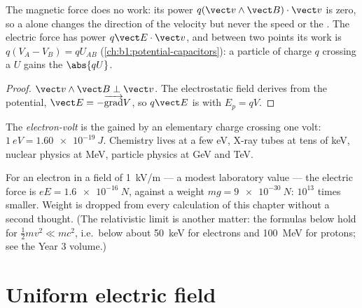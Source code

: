 \begin{proposition}\label{prop:b1:charged-particles:work}
The magnetic force does no work: its power $q(\vect v\wedge\vect B)\cdot\vect v$
is zero, so a  alone changes the direction of the velocity
but never the speed or the . The electric force has power
$q\vect E\cdot\vect v$, and between two points its work is $q(V_A - V_B) =
qU_{AB}$ (\cref{ch:b1:potential-capacitors}): a particle of charge $q$
crossing a  $U$ gains the  $\abs{qU}$.
\end{proposition}

\begin{proof}
$\vect v\wedge\vect B \perp \vect v$. The electrostatic field derives from
the potential, $\vect E = -\overrightarrow{\operatorname{grad}}V$, so $q\vect E$
is  with $E_p = qV$.
\end{proof}

\begin{definition}\label{def:b1:charged-particles:eV}
The \emph{electron-volt} is the  gained by an elementary
charge crossing one volt: $\qty{1}{eV} = \qty{1.60e-19}{J}$. Chemistry
lives at a few eV, X-ray tubes at tens of keV, nuclear physics at MeV,
particle physics at GeV and TeV.
\end{definition}

\begin{remark}\label{rem:b1:charged-particles:gravity}
For an electron in a field of \qty{1}{kV/m} --- a modest laboratory
value --- the electric force is $eE = \qty{1.6e-16}{N}$, against a weight
$mg = \qty{9e-30}{N}$: $10^{13}$ times smaller. Weight is dropped from
every calculation of this chapter without a second thought. (The
relativistic limit is another matter: the formulas below hold for
$\tfrac12 mv^2 \ll mc^2$, i.e.\ below about \qty{50}{keV} for electrons
and \qty{100}{MeV} for protons; see the Year 3 volume.)
\end{remark}

\section{Uniform electric field}

